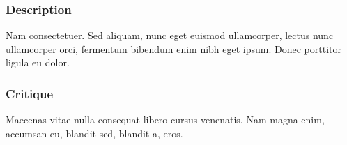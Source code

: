 \documentclass[10pt]{article}
\begin{document}
\begin{multicols}{2}
\subsubsection*{Description}
Nam consectetuer. Sed aliquam, nunc eget euismod ullamcorper, lectus nunc ullamcorper orci, fermentum bibendum enim nibh eget ipsum. Donec porttitor ligula eu dolor. 

\subsubsection*{Critique}
Maecenas vitae nulla consequat libero cursus venenatis. Nam magna enim, accumsan eu, blandit sed, blandit a, eros.

\end{multicols}
\end{document}
